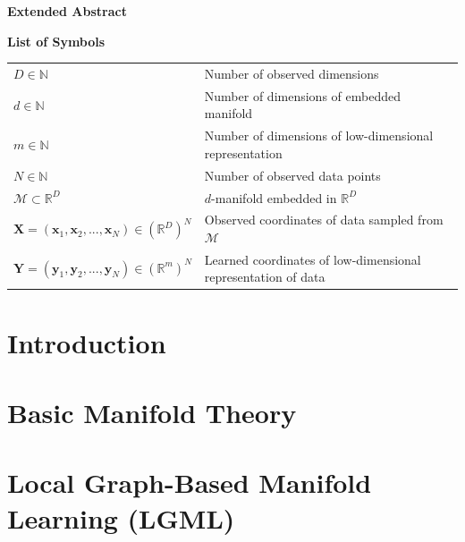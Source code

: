 \documentclass[12pt]{article}
\newcommand{\mani}{\mathcal{M}}
\newcommand{\N}{\mathbb{N}}
\newcommand{\R}{\mathbb{R}}
\newcommand{\RD}{\mathbb{R}^D}
\begin{document}
\Large
\noindent
\textbf{Extended Abstract}
\vspace{0.5cm} \\
\noindent
\normalsize

\newpage

\tableofcontents
\newpage

\Large
\noindent
\textbf{List of Symbols}
\vspace{0.5cm} \\
\noindent
\normalsize

\begin{tabularx}{\textwidth}{ 
  >{\raggedleft\arraybackslash}X 
  >{\raggedright\arraybackslash}X}
  $D \in \N$ & Number of observed dimensions \\
  $d \in \N$ & Number of dimensions of embedded manifold \\
  $m \in \N$ & Number of dimensions of low-dimensional representation \\
  $N \in \N$ & Number of observed data points \\
  $\mani \subset \RD$ & $d$-manifold embedded in $\RD$ \\
  $\bm{X} = (\bm{x}_1, \bm{x}_2, ..., \bm{x}_N) \in (\RD)^N$ & Observed 
  coordinates of data sampled from $\mani$ \\
  $\bm{Y} = (\bm{y}_1, \bm{y}_2, ..., \bm{y}_N) \in (\R^m)^N$ & Learned 
  coordinates of low-dimensional representation of data
\end{tabularx}

\newpage

\listoffigures
\newpage
\listoftables
\newpage


    
\section{Introduction}
\label{intro}


\section{Basic Manifold Theory}
\label{math}


\section{Local Graph-Based Manifold Learning (LGML)}
\label{lgb-mani-learn}

\end{document}
